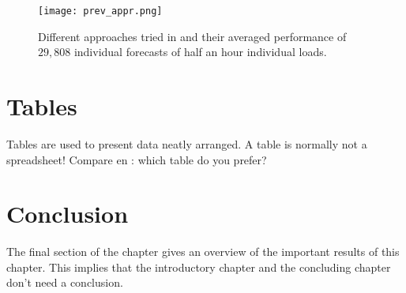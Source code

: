 \begin{figure}[h!]
	\centering
	\texttt{[image: prev\_appr.png]}
	\caption{Different approaches tried in \cite{Kong2019} and their averaged performance of $ 29,808 $ individual forecasts of half an hour individual loads. }
	\label{tab:LSTM_lit_result}
\end{figure}










\section{Tables}
Tables are used to present data neatly arranged. A table is normally
not a spreadsheet! Compare  en : which table do
you prefer?

%



\section{Conclusion}
The final section of the chapter gives an overview of the important results
of this chapter. This implies that the introductory chapter and the
concluding chapter don't need a conclusion.



